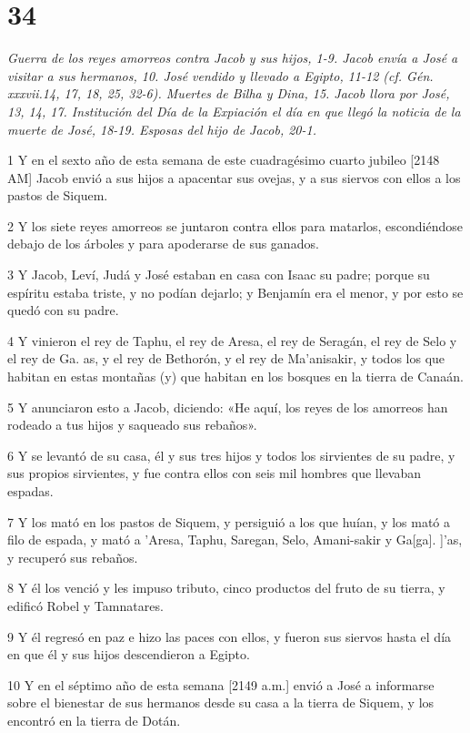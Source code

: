 \chapter{34}

\par \textit{Guerra de los reyes amorreos contra Jacob y sus hijos, 1-9. Jacob envía a José a visitar a sus hermanos, 10. José vendido y llevado a Egipto, 11-12 (cf. Gén. xxxvii.14, 17, 18, 25, 32-6). Muertes de Bilha y Dina, 15. Jacob llora por José, 13, 14, 17. Institución del Día de la Expiación el día en que llegó la noticia de la muerte de José, 18-19. Esposas del hijo de Jacob, 20-1.}

\par 1 Y en el sexto año de esta semana de este cuadragésimo cuarto jubileo [2148 AM] Jacob envió a sus hijos a apacentar sus ovejas, y a sus siervos con ellos a los pastos de Siquem.
\par 2 Y los siete reyes amorreos se juntaron contra ellos para matarlos, escondiéndose debajo de los árboles y para apoderarse de sus ganados.
\par 3 Y Jacob, Leví, Judá y José estaban en casa con Isaac su padre; porque su espíritu estaba triste, y no podían dejarlo; y Benjamín era el menor, y por esto se quedó con su padre.
\par 4 Y vinieron el rey de Taphu, el rey de Aresa, el rey de Seragán, el rey de Selo y el rey de Ga. as, y el rey de Bethorón, y el rey de Ma'anisakir, y todos los que habitan en estas montañas (y) que habitan en los bosques en la tierra de Canaán.
\par 5 Y anunciaron esto a Jacob, diciendo: «He aquí, los reyes de los amorreos han rodeado a tus hijos y saqueado sus rebaños».
\par 6 Y se levantó de su casa, él y sus tres hijos y todos los sirvientes de su padre, y sus propios sirvientes, y fue contra ellos con seis mil hombres que llevaban espadas.
\par 7 Y los mató en los pastos de Siquem, y persiguió a los que huían, y los mató a filo de espada, y mató a 'Aresa, Taphu, Saregan, Selo, Amani-sakir y Ga[ga]. ]'as, y recuperó sus rebaños.
\par 8 Y él los venció y les impuso tributo, cinco productos del fruto de su tierra, y edificó Robel y Tamnatares.
\par 9 Y él regresó en paz e hizo las paces con ellos, y fueron sus siervos hasta el día en que él y sus hijos descendieron a Egipto.
\par 10 Y en el séptimo año de esta semana [2149 a.m.] envió a José a informarse sobre el bienestar de sus hermanos desde su casa a la tierra de Siquem, y los encontró en la tierra de Dotán.
